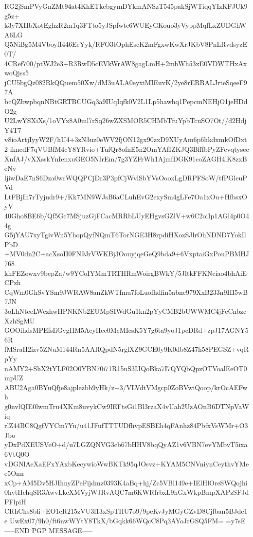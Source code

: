 RG2jSmPVyGnZMt94at4KhETkebgymDYkmANSzT545pakSjWTiqqYIzKFJUk9g5z+
k3y7XHbXotEghzR2m1q3FTto5yJSpfwtc6WUEyGKouo3yVyppMqfLxZUDGhWA6LG
Q5NiBg5M4VboyfI446EeYyk/RFO3tOphEscK2mFgxwKwXrJKbV8PnLRvdsyzE0T/
4CRef700/ptWJ2e3+R3RwD5cEVkWrAW8gagLmH+2mbWh53xE0VDWTHxAxwoQjss5
jCU5bgQz082RkQQuem50Xw/dM3uALA0eyxiMIEuvK/2ye8rERBALJrteSqeeF97A
bcQZbwpbqnNBtGRTBCUGq3a9IUqIqfk0V2L1Lp5hawhq1PepcmNEHjO1jeHDdO2g
U2LwYSXiXs/1oVYx8A0ml7rSq26wZXSMOR5CHMbTfuYpbTcuSO7Ot//d2HdjY4T7
v8ioArtjIyyW2F/hU4+3zN3uz0eWV2fjON12gx90zxD9XUyAm6p6hkdxmkOfDxt2
iknedF7qVUBfM4cY8YRvio+TufQr8ofnE5n2OmYAfIZKJQ3BfffbPyZFcvqtysec
XnfAJ/vXXsskYnIenxuGEO5NIrEm/7g3YZFrWh1AjmfDGK91coZAGH4lK8zxBeNv
ljiwDaE7nS6Dza0wcWQQPCjDr3P3pfCjWvlSbYVsOooxLgDRPFSoW/tfPGleuPVd
LtFBjIh7rTyjudr9+/Kk7MN9WJsB6aCLuhEvG2exySm4gLFe7Oa1xOu+HfbsxOyV
40Gho8BE6b/Qf5Gc7MSjuzGjFCacMRRbLUyEHgvsGZlV+w6C2oiIp1AGl4p0O44g
G5jYAU7xyTgivWn5YhopQyfNQmT6TorNGE3H8rpdiHXozSJlrOhNDND7YokIlPbD
+MV0dn2C+acXsoII0FN9JrVWKBj3OouyjqeGeQ9bda9+6VxptaiGxPouPBMHJ768
khFEZowxv9bepZa/w9YCoIYMmTRTHRmWoirgBWkY/5JltkFFKNciao4bhAiECPzh
CqWm0GhSvYSm9JWRAW8anZkWTfmu7foLuofhdfin5abne979XxB233n9HI5wB7JN
3oLhNteeLWczhwHPNKNb2EUMpSIWdGu1kn2pYyCMB2bUWWMC4jFeCnbzcXzhSgMU
GOOihdsMPEfsIiGvgHM5AcyHec0McMIesK5Y7g6ta9yoJ1pcDRd+zpJ17AGNY56R
fMSraH2izv5ZNuM144Rn5AARQpdN5rglXZ9GCE0y9K0db8Z47h58PEGSZ+vqRpYy
nAMY2+ShX2tYLF02O0YBN70i71R15nS3IJQoBka7I7QYQbQpzOTVoalEeOT0mpUZ
ABU2Aga0BYuQfje8ajplezbb9yHk/z+3/VLVdtVMgcp0ZoBVwiQoop/krOcAEFwh
g0nvlQIE0lwmTru4XKm8uvykCw9IEFtsGi1Bl3rzaX4vUah2UzAOnB6DTNpVaWiq
rlZ44BC8QgfVYCm7Yu/u41JFufTTTUDfhvpESBEh4qFAnhz84PbfxVsWMr+O3Jbo
yDxPdXEUSVeO+d/u7LGZQNVG3cb67bHHV8bqQyAZ1v6VBN7evYMbvT5ixa6VtQ0O
vDGNlAeXaEFxYAxbKecywioWwBKTk95qJOsvz+KYAM5CNVniynCeythvYMee5Onn
xCp+AM5Dv5HJIhnyZPeFijdmz0393K4aBq+hj/Zc5VBl149e+IElHlOreSWQojhi
0hvtHchqSR3AwvLkcXMVyjWJRvAQC7m6KWRfrbxL9hGxWkpBmpXAPzSFJdPFlpiH
CRhChs8bli+EO1eR215zVU3l13xSpTHU7o9/9peKvJyMGyGZvD8Cjfban5BJdc1e
UwEx07/9h0/ft6nwWYtY8TkX/bGqkk66WQcC8Pq3AYoJrGSQ5FM=
=y7sE
-----END PGP MESSAGE-----
